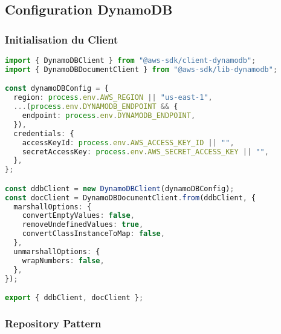 \subsection{Configuration DynamoDB}

\subsubsection{Initialisation du Client}

\begin{lstlisting}[language=TypeScript, caption=Configuration DynamoDB Client]
import { DynamoDBClient } from "@aws-sdk/client-dynamodb";
import { DynamoDBDocumentClient } from "@aws-sdk/lib-dynamodb";

const dynamoDBConfig = {
  region: process.env.AWS_REGION || "us-east-1",
  ...(process.env.DYNAMODB_ENDPOINT && {
    endpoint: process.env.DYNAMODB_ENDPOINT,
  }),
  credentials: {
    accessKeyId: process.env.AWS_ACCESS_KEY_ID || "",
    secretAccessKey: process.env.AWS_SECRET_ACCESS_KEY || "",
  },
};

const ddbClient = new DynamoDBClient(dynamoDBConfig);
const docClient = DynamoDBDocumentClient.from(ddbClient, {
  marshallOptions: {
    convertEmptyValues: false,
    removeUndefinedValues: true,
    convertClassInstanceToMap: false,
  },
  unmarshallOptions: {
    wrapNumbers: false,
  },
});

export { ddbClient, docClient };
\end{lstlisting}

\subsubsection{Repository Pattern}

